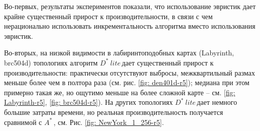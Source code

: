 \documentclass[11pt]{article}
\newcommand{\dstarlite}{\(D^*\ lite\)\,}
\newcommand{\astar}{\(A^*\)\,}
\begin{document}
    Во-первых, результаты экспериментов показали, что использование эвристик дает крайне существенный прирост к производительности, в связи с чем нерационально использовать инкрементальность алгоритма вместо использования эвристик.

    Во-вторых, на низкой видимости в лабиринтоподобных картах (Labyrinth, brc504d) топологиях алгоритм \dstarlite дает существенный прирост к производительности: практически отсутствуют выбросы, межквартильный размах меньше более чем в полтора раза (см. рис. \ref{fig: den401d-r5}); медиана при этом примерно такая же, но ощутимо меньше на более сложной карте -- см. \ref{fig: Labyrinth-r5}, \ref{fig: brc504d-r5}).
    На других топологиях \dstarlite дает немного большие затраты времени, но реальная производительность получается сравнимой с \astar, см. Рис. \ref{fig: NewYork_1_256-r5}.
\end{document}
